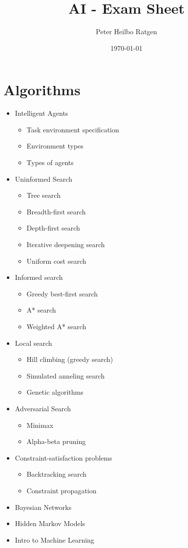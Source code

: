 \documentclass{article}
\title{AI - Exam Sheet}
\author{Peter Heilbo Ratgen}
\date{\today}
\begin{document}
\maketitle

\section{Algorithms}%
\label{sec:algorithms}

\begin{itemize}
    \item Intelligent Agents
        \begin{itemize}
            \item Task environment specification
            \item Environment types
            \item Types of agents
        \end{itemize}
    \item Uninformed Search
        \begin{itemize}
            \item Tree search
            \item Breadth-first search
            \item Depth-first search
            \item Iterative deepening search
            \item Uniform cost search
        \end{itemize}
    \item Informed search
        \begin{itemize}
            \item Greedy best-first search
            \item A* search
            \item Weighted A* search
        \end{itemize}
    \item Local search
        \begin{itemize}
            \item Hill climbing (greedy search)
            \item Simulated anneling search
            \item Genetic algorithms
        \end{itemize}
    \item Adversarial Search
        \begin{itemize}
            \item Minimax
            \item Alpha-beta pruning
        \end{itemize}
    \item Constraint-satisfaction problems
        \begin{itemize}
            \item Backtracking search
            \item Constraint propagation
        \end{itemize}
    \item Bayesian Networks
    \item Hidden Markov Models
    \item Intro to Machine Learning
\end{itemize}
\end{document}

